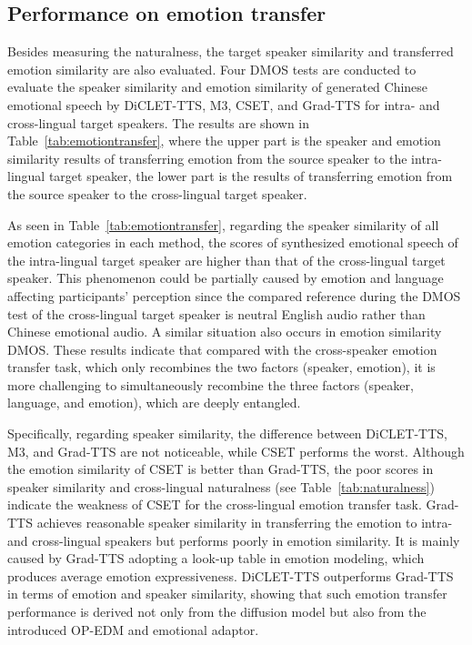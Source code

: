 \documentclass[journal,comsoc]{IEEEtran}
\begin{document}
\vspace{-0.2cm}
\subsection{Performance on emotion transfer}
\label{sc:emotrans}

Besides measuring the naturalness, the target speaker similarity and transferred emotion similarity are also evaluated.
Four DMOS tests are conducted to evaluate the speaker similarity and emotion similarity of generated Chinese emotional speech by DiCLET-TTS, M3, CSET, and Grad-TTS for intra- and cross-lingual target speakers.
The results are shown in Table~\ref{tab:emotiontransfer}, where the upper part is the speaker and emotion similarity results of transferring emotion from the source speaker to the intra-lingual target speaker, the lower part is the results of transferring emotion from the source speaker to the cross-lingual target speaker.

As seen in Table~\ref{tab:emotiontransfer}, regarding the speaker similarity of all emotion categories in each method, the scores of synthesized emotional speech of the intra-lingual target speaker are higher than that of the cross-lingual target speaker. 
This phenomenon could be partially caused by emotion and language affecting participants' perception since the compared reference during the DMOS test of the cross-lingual target speaker is neutral English audio rather than Chinese emotional audio.
A similar situation also occurs in emotion similarity DMOS.
These results indicate that compared with the cross-speaker emotion transfer task, which only recombines the two factors (speaker, emotion), it is more challenging to simultaneously recombine the three factors (speaker, language, and emotion), which are deeply entangled.

Specifically, regarding speaker similarity, the difference between DiCLET-TTS, M3, and Grad-TTS are not noticeable, while CSET performs the worst.
Although the emotion similarity of CSET is better than Grad-TTS, the poor scores in speaker similarity and cross-lingual naturalness (see Table~\ref{tab:naturalness}) indicate the weakness of CSET for the cross-lingual emotion transfer task.
Grad-TTS achieves reasonable speaker similarity in transferring the emotion to intra- and cross-lingual speakers but performs poorly in emotion similarity. 
It is mainly caused by Grad-TTS adopting a look-up table in emotion modeling, which produces average emotion expressiveness. 
DiCLET-TTS outperforms Grad-TTS in terms of emotion and speaker similarity, showing that such emotion transfer performance is derived not only from the diffusion model but also from the introduced OP-EDM and emotional adaptor.
\end{document}
